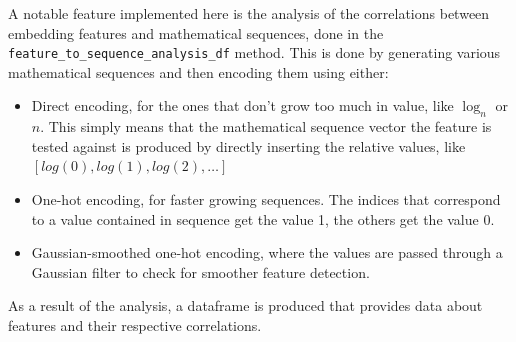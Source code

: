 \documentclass[
  a4paper, twoside, 10pt, titlepage]{book}
\providecommand{\tightlist}{%
  \setlength{\itemsep}{0pt}\setlength{\parskip}{0pt}}
\begin{document}
A notable feature implemented here is the analysis of the correlations
between embedding features and mathematical sequences, done in the
\texttt{feature\_to\_sequence\_analysis\_df} method. This is done by
generating various mathematical sequences and then encoding them using
either:

\begin{itemize}
\tightlist
\item
  Direct encoding, for the ones that don't grow too much in value, like
  \(\log_n\) or \(n\). This simply means that the mathematical sequence
  vector the feature is tested against is produced by directly inserting
  the relative values, like \([log(0), log(1),
  log(2), \ldots]\)
\item
  One-hot encoding, for faster growing sequences. The indices that
  correspond to a value contained in sequence get the value 1, the
  others get the value 0.
\item
  Gaussian-smoothed one-hot encoding, where the values are passed
  through a Gaussian filter to check for smoother feature detection.
\end{itemize}

As a result of the analysis, a dataframe is produced that provides data
about features and their respective correlations.
\end{document}
